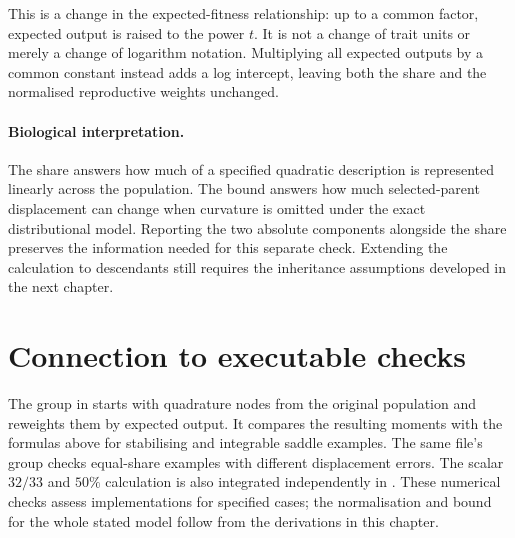 This is a change in the expected-fitness relationship: up to a common
factor, expected output is raised to the power $t$. It is not a change
of trait units or merely a change of logarithm notation. Multiplying all
expected outputs by a common constant instead adds a log intercept,
leaving both the share and the normalised reproductive weights unchanged.

\paragraph{Biological interpretation.}
The share answers how much of a specified quadratic description is
represented linearly across the population. The bound answers how much
selected-parent displacement can change when curvature is omitted under
the exact distributional model. Reporting the two absolute components
alongside the share preserves the information needed for this separate
check. Extending the calculation to descendants still requires the
inheritance assumptions developed in the next chapter.

\section{Connection to executable checks}

The  group in
 starts with
quadrature nodes from the original population and reweights them by
expected output. It compares the resulting moments with the formulas
above for stabilising and integrable saddle examples. The same file's
 group checks equal-share
examples with different displacement errors. The scalar $32/33$ and
$50\%$ calculation is also integrated independently in
.
These numerical checks assess implementations for specified cases; the
normalisation and bound for the whole stated model follow from the
derivations in this chapter.
